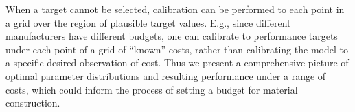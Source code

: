 \documentclass[12pt]{article}
\begin{document}

When a target cannot be selected, calibration can be performed to each point in a grid over the region of plausible target values.
%
E.g., since different manufacturers have different budgets, one can calibrate to performance targets under each point of a grid of ``known'' costs, rather than calibrating the model to a specific desired observation of cost.
%
Thus we present a comprehensive picture of optimal parameter distributions and resulting performance under a range of costs, which could inform the process of setting a budget for material construction.

\end{document}
